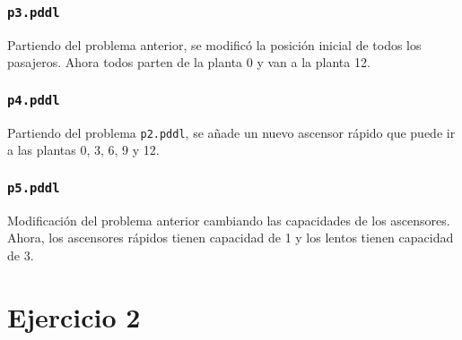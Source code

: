 \documentclass{article}
\begin{document}
\subsubsection{\texttt{p3.pddl}}
Partiendo del problema anterior, se modificó la posición inicial de todos los pasajeros. Ahora todos parten de la planta 0 y van a la planta 12.

\subsubsection{\texttt{p4.pddl}}
Partiendo del problema \texttt{p2.pddl}, se añade un nuevo ascensor rápido que puede ir a las plantas 0, 3, 6, 9 y 12.

\subsubsection{\texttt{p5.pddl}}
Modificación del problema anterior cambiando las capacidades de los ascensores. Ahora, los ascensores rápidos tienen capacidad de 1 y los lentos tienen capacidad de 3.

\section{Ejercicio 2}
\end{document}
